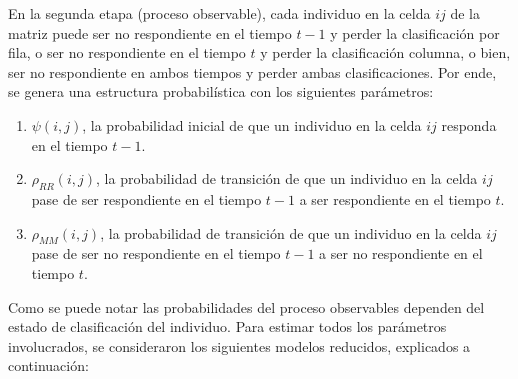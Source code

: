 \documentclass[
  12pt,
  spanish,
]{book}
\providecommand{\tightlist}{%
  \setlength{\itemsep}{0pt}\setlength{\parskip}{0pt}}
\begin{document}
En la segunda etapa (proceso observable), cada individuo en la celda \(ij\) de la matriz puede ser no respondiente en el tiempo \(t-1\) y perder la clasificación por fila, o ser no respondiente en el tiempo \(t\) y perder la clasificación columna, o bien, ser no respondiente en ambos tiempos y perder ambas clasificaciones. Por ende, se genera una estructura probabilística con los siguientes parámetros:

\begin{enumerate}
\def\labelenumi{\arabic{enumi}.}
\tightlist
\item
  \(\psi(i,j)\), la probabilidad inicial de que un individuo en la celda \(ij\) responda en el tiempo \(t-1\).
\item
  \(\rho_{RR}(i,j)\), la probabilidad de transición de que un individuo en la celda \(ij\) pase de ser respondiente en el tiempo \(t-1\) a ser respondiente en el tiempo \(t\).
\item
  \(\rho_{MM}(i,j)\), la probabilidad de transición de que un individuo en la celda \(ij\) pase de ser no respondiente en el tiempo \(t-1\) a ser no respondiente en el tiempo \(t\).
\end{enumerate}

Como se puede notar las probabilidades del proceso observables dependen del estado de clasificación del individuo. Para estimar todos los parámetros involucrados, se consideraron los siguientes modelos reducidos, explicados a continuación:
\end{document}
